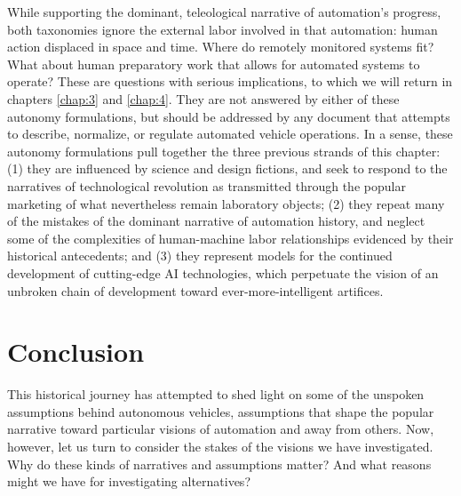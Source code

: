 While supporting the dominant, teleological narrative of automation's
progress, both
taxonomies ignore the external labor involved in that automation:
human action displaced in space and time. Where do remotely monitored
systems fit? What about human preparatory work that allows for
automated systems to operate? These are questions with serious
implications, to which we will
return in chapters \ref{chap:3} and \ref{chap:4}. They are not
answered by either of these autonomy formulations, but should be
addressed by any document that attempts to describe, normalize, or
regulate automated vehicle operations. In a sense, these autonomy
formulations pull together the three previous strands of this
chapter: (1) they are influenced by science and design fictions, and seek
to respond to the narratives of technological revolution as
transmitted through the popular marketing of what nevertheless remain laboratory
objects; (2) they repeat many of the mistakes of the dominant narrative of
automation history, and neglect some of the complexities of
human-machine labor relationships evidenced by their historical
antecedents; and (3) they represent models for the
continued development of cutting-edge AI technologies, which perpetuate
the vision of an unbroken chain of development toward
ever-more-intelligent artifices. 

\section{Conclusion}

This historical journey has attempted
to shed light on some of the unspoken assumptions behind autonomous
vehicles, assumptions that shape the popular narrative toward
particular visions of automation and away from others. Now, however,
let us turn to consider the stakes of the 
visions we have investigated. Why do these kinds of narratives and
assumptions matter? And what 
reasons might we have for investigating alternatives?



